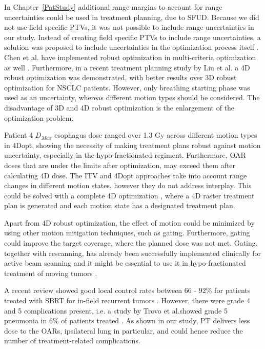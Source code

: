 In Chapter~\ref{PatStudy} additional range margins to account for range uncertainties could be used in treatment planning, due to SFUD. 
Because we did not use field specific PTVs, it was not possible to include range uncertainties in our study.
Instead of creating field specific PTVs to include range uncertainties, a solution was proposed to include uncertainties in the optimization process itself \cite{Pflugfelder2008, Unkelbach2009, Fredriksson2011, Chen2012}.
Chen et al. have implemented robust optimization in multi-criteria optimization as well \cite{Chen2012}. Furthermore, in a recent treatment planning study by Liu et al. \cite{Liu2016}
a 4D robust optimization was demonstrated, with better results over 3D robust optimization for NSCLC patients. However, only breathing starting phase was used as an uncertainty,
whereas different motion types should be considered. The disadvantage of 3D and 4D robust optimization is the enlargement of the optimization problem.

Patient 4 $D_{Max}$ esophagus dose ranged over 1.3 Gy across different motion types in 4Dopt, showing the necessity of making treatment plans robust against motion uncertainty, 
especially in the hypo-fractionated regiment. Furthermore, OAR doses that are under the limits after optimization, may exceed them after calculating 4D dose. 
The ITV and 4Dopt approaches take into account range changes in different motion states, however they do not address interplay. 
This could be solved with a complete 4D optimization \cite{Graeff2013}, where a 4D raster treatment plan is 
generated and each motion state has a designated treatment plan. 


Apart from 4D robust optimization, the effect of motion could be minimized by using other motion mitigation techniques, such as gating. Furthermore, gating could improve the target coverage, where the planned dose was
not met. Gating, together with rescanning, has already been successfully implemented clinically for active beam scanning \cite{Rossi2016, Mori2016} and it might be essential to use it in hypo-fractionated 
treatment of moving tumors \cite{Richter2014}.

A recent review showed good local control rates between 66 - 92\% for patients treated with SBRT for in-field recurrent tumors \cite{Amini2014}. 
However, there were grade 4 and 5 complications present, i.e. a study by Trovo et al.showed grade 5 pneumonia in
6\% of patients treated \cite{Trovo2014}. As shown in our study, PT delivers less dose to the OARs, ipsilateral lung in particular, and could hence reduce the number of treatment-related
complications.


